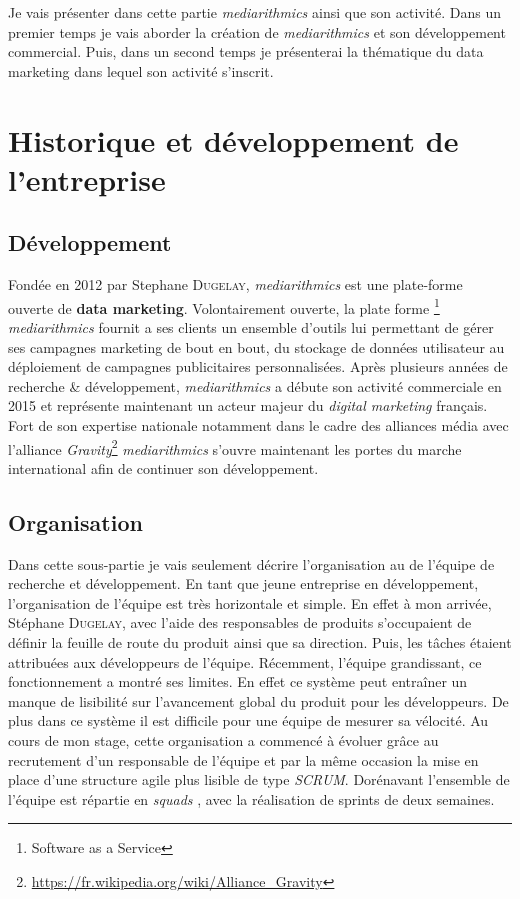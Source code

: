 Je vais présenter dans cette partie \emph{mediarithmics} ainsi que son activité. Dans un premier temps je vais 
aborder la création de \emph{mediarithmics} et son développement commercial. Puis, dans un second temps je 
présenterai la thématique du data marketing dans lequel son activité s'inscrit.
    \section{Historique et développement de l'entreprise}
        \subsection{Développement}
            Fondée en 2012 par Stephane \textsc{Dugelay}, \emph{mediarithmics} est une plate-forme ouverte de 
            \textbf{data marketing}. Volontairement ouverte, la plate forme \footnote{Software as a Service} 
            \emph{mediarithmics} fournit a ses clients un ensemble d'outils lui permettant de gérer ses campagnes 
            marketing de bout en bout, du stockage de données utilisateur au déploiement de campagnes publicitaires 
            personnalisées. Après plusieurs années de recherche \& développement, \emph{mediarithmics} a débute son 
            activité commerciale en 2015 et représente maintenant un acteur majeur du \emph{digital marketing} français. 
            Fort de son expertise nationale notamment dans le cadre des alliances média avec l'alliance 
            \emph{Gravity}\footnote{\url{https://fr.wikipedia.org/wiki/Alliance\_Gravity}} \emph{mediarithmics} s'ouvre 
            maintenant les portes du marche international afin de continuer son développement.
        \subsection{Organisation}
            Dans cette sous-partie je vais seulement décrire l'organisation au de l'équipe de recherche et développement.
            En tant que jeune entreprise en développement, l'organisation de l'équipe est très horizontale et simple. 
            En effet à mon arrivée, Stéphane \textsc{Dugelay}, avec l'aide des responsables de produits s'occupaient de 
            définir la feuille de route du produit ainsi que sa direction. Puis, les tâches étaient attribuées aux 
            développeurs de l'équipe. Récemment, l'équipe grandissant, ce fonctionnement a montré ses limites. En effet 
            ce système peut entraîner un manque de lisibilité sur l'avancement global du produit pour les développeurs. 
            De plus dans ce système il est difficile pour une équipe de mesurer sa vélocité. Au cours de mon stage, 
            cette organisation a commencé à évoluer grâce au recrutement d'un responsable de l'équipe et par la même 
            occasion la mise en place d'une structure agile plus lisible de type \emph{SCRUM}. Dorénavant l'ensemble de l'équipe est 
            répartie en \emph{squads} \cite{spotify}, avec la réalisation de sprints de deux semaines.

